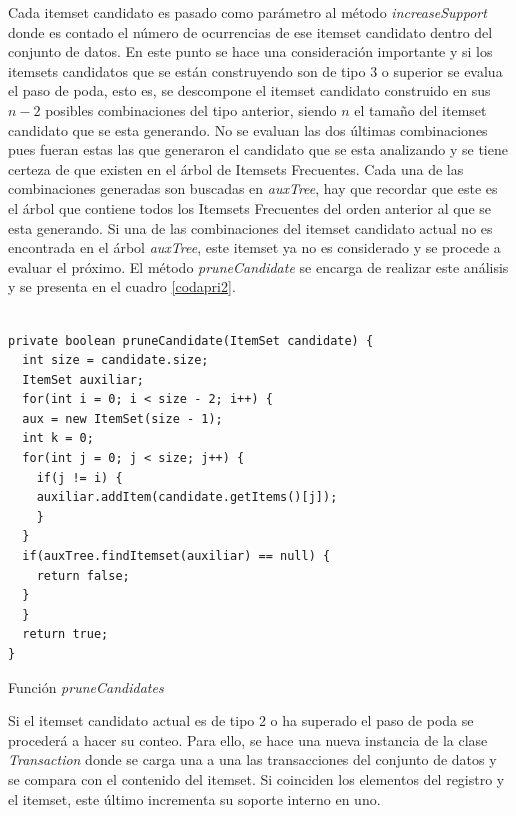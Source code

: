 Cada itemset candidato es pasado como par\'ametro al m\'etodo \textit{increaseSupport} donde es contado el
n\'umero de ocurrencias de ese itemset candidato dentro del conjunto de datos.  En este punto se hace una
consideraci\'on importante y si los itemsets candidatos que se est\'an construyendo son de tipo 3 o superior se
evalua el paso de poda, esto es, se descompone el itemset candidato construido en sus $n-2$ posibles
combinaciones del tipo anterior, siendo $n$ el tama\~no del itemset candidato que se esta generando.  No se
evaluan las dos \'ultimas combinaciones pues fueran estas las que generaron el candidato que se esta analizando y
se tiene certeza de que existen en el \'arbol de Itemsets Frecuentes.  Cada una de las combinaciones generadas
son buscadas en \textit{auxTree}, hay que recordar que este es el \'arbol que contiene todos los Itemsets
Frecuentes del orden anterior al que se esta generando.  Si una de las combinaciones del itemset candidato actual
no es encontrada en el \'arbol \textit{auxTree}, este itemset ya no es considerado y se procede a evaluar el
pr\'oximo.  El m\'etodo \textit{pruneCandidate} se encarga de realizar este an\'alisis y se presenta en el
cuadro \ref{codapri2}.\\

\begin{codigof}[ht]
\begin{verbatim}

private boolean pruneCandidate(ItemSet candidate) {
  int size = candidate.size;
  ItemSet auxiliar;
  for(int i = 0; i < size - 2; i++) {
  aux = new ItemSet(size - 1);
  int k = 0;
  for(int j = 0; j < size; j++) {
    if(j != i) {
    auxiliar.addItem(candidate.getItems()[j]);
    }
  }
  if(auxTree.findItemset(auxiliar) == null) {
    return false;
  }
  }
  return true;
}
\end{verbatim}
\caption{Funci\'on \textit{pruneCandidates}}
\label{codapri2}
\end{codigof}

Si el itemset candidato actual es de tipo 2 o ha superado el paso de poda se proceder\'a a hacer su conteo.  Para
ello, se hace una nueva instancia de la clase \textit{Transaction} donde se carga una a una las transacciones del
conjunto de datos y se compara con el contenido del itemset.  Si coinciden los elementos del registro y el
itemset, este \'ultimo incrementa su soporte interno en uno.\\

